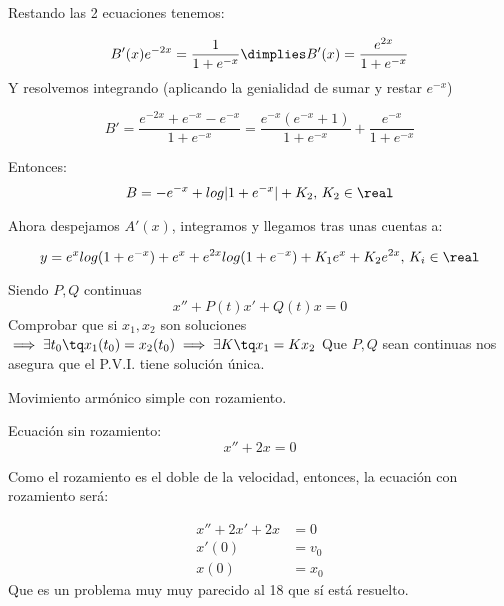 \documentclass[nochap]{apuntes}
\begin{document}
\begin{problem}[14]
Restando las 2 ecuaciones tenemos:

\[B'(x)e^{-2x} = \frac{1}{1+e^{-x}} \dimplies B'(x) = \frac{e^{2x}}{1+e^{-x}}\]
Y resolvemos integrando (aplicando la genialidad de sumar y restar $e^{-x}$)

\[B'=\frac{e^{-2x}+e^{-x} - e^{-x}}{1+e^{-x}} = \frac{e^{-x}(e^{-x} + 1)}{1+e^{-x}} + \frac{e^{-x}}{1+e^{-x}}\]

Entonces: \[B=-e^{-x} + log|1+e^{-x}| + K_2,\,K_2\in\real\]

Ahora despejamos $A'(x)$, integramos y llegamos tras unas cuentas a:

\[y = e^xlog(1+e^{-x}) + e^x + e^{2x}log(1+e^{-x}) + K_1e^x+K_2e^{2x},\,K_i\in\real\]


\end{problem}


\begin{problem}[16]
Siendo $P,Q$ continuas
\[x''+P(t)x'+ Q(t)x = 0\]
Comprobar que si $x_1,x_2$ son soluciones $\implies \exists t_0 \tq x_1(t_0) = x_2(t_0) \implies \exists K \tq x_1 = Kx_2$
\solution
Que $P,Q$ sean continuas nos asegura que el P.V.I. tiene solución única.

\end{problem}



\begin{problem}[17]

Movimiento armónico simple con rozamiento.

\solution

Ecuación sin rozamiento:
\[x''+2x=0\]

Como el rozamiento es el doble de la velocidad, entonces, la ecuación con rozamiento será:

\[
\begin{array}{cc}
x'' + 2x' + 2x &= 0\\
x'(0)  &= v_0\\
x(0)  &= x_0
\end{array}\]
Que es un problema muy muy parecido al 18 que sí está resuelto.
\end{problem}
\end{document}
